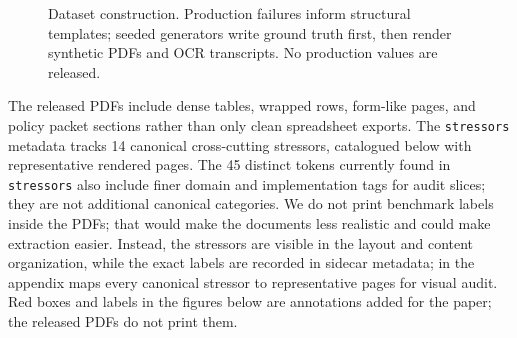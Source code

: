 \begin{figure}[H]
{}
\caption{Dataset construction. Production failures inform structural templates; seeded generators write ground truth first, then render synthetic PDFs and OCR transcripts. No production values are released.}
\label{fig:pipeline}
\end{figure}

The released PDFs include dense tables, wrapped rows, form-like pages, and policy packet sections rather than only clean spreadsheet exports. The \texttt{stressors} metadata tracks 14 canonical cross-cutting stressors, catalogued below with representative rendered pages. The 45 distinct tokens currently found in \texttt{stressors} also include finer domain and implementation tags for audit slices; they are not additional canonical categories. We do not print benchmark labels inside the PDFs; that would make the documents less realistic and could make extraction easier. Instead, the stressors are visible in the layout and content organization, while the exact labels are recorded in sidecar metadata;  in the appendix maps every canonical stressor to representative pages for visual audit. Red boxes and labels in the figures below are annotations added for the paper; the released PDFs do not print them.

